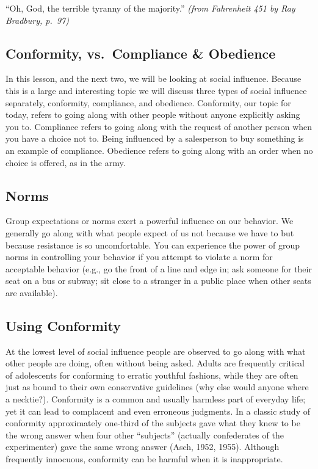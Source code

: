 \documentclass[
]{book}
\begin{document}
``Oh, God, the terrible tyranny of the majority.'' \emph{(from Fahrenheit 451 by Ray Bradbury, p.~97)}

\hypertarget{conformity-vs.-compliance-obedience}{%
\subsection*{Conformity, vs.~Compliance \& Obedience}\label{conformity-vs.-compliance-obedience}}

In this lesson, and the next two, we will be looking at social influence. Because this is a large and interesting topic we will discuss three types of social influence separately, conformity, compliance, and obedience. Conformity, our topic for today, refers to going along with other people without anyone explicitly asking you to. Compliance refers to going along with the request of another person when you have a choice not to. Being influenced by a salesperson to buy something is an example of compliance. Obedience refers to going along with an order when no choice is offered, as in the army.

\hypertarget{norms}{%
\subsection*{Norms}\label{norms}}

Group expectations or norms exert a powerful influence on our behavior. We generally go along with what people expect of us not because we have to but because resistance is so uncomfortable. You can experience the power of group norms in controlling your behavior if you attempt to violate a norm for acceptable behavior (e.g., go the front of a line and edge in; ask someone for their seat on a bus or subway; sit close to a stranger in a public place when other seats are available).

\hypertarget{using-conformity}{%
\subsection*{Using Conformity}\label{using-conformity}}

At the lowest level of social influence people are observed to go along with what other people are doing, often without being asked. Adults are frequently critical of adolescents for conforming to erratic youthful fashions, while they are often just as bound to their own conservative guidelines (why else would anyone where a necktie?). Conformity is a common and usually harmless part of everyday life; yet it can lead to complacent and even erroneous judgments. In a classic study of conformity approximately one-third of the subjects gave what they knew to be the wrong answer when four other ``subjects'' (actually confederates of the experimenter) gave the same wrong answer (Asch, 1952, 1955). Although frequently innocuous, conformity can be harmful when it is inappropriate.
\end{document}
